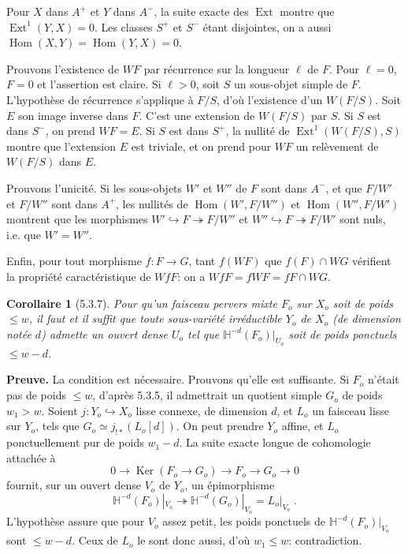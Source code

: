 \documentclass[12pt,a4paper]{article}
\theoremstyle{plain}
\newtheorem{corollary}[theorem]{Corollaire}
\theoremstyle{definition}
\theoremstyle{remark}
\DeclareMathOperator{\Hom}{Hom}
\DeclareMathOperator{\Ext}{Ext}
\DeclareMathOperator{\Ker}{Ker}
\newcommand{\HH}{\mathbb{H}}
\begin{document}
Pour $X$ dans $A^+$ et $Y$ dans $A^-$, la suite exacte des $\Ext$ montre que $\Ext^1(Y,X) = 0$. Les classes $S^+$ et $S^-$ \'etant disjointes, on a aussi $\Hom(X,Y) = \Hom(Y,X) = 0$.

Prouvons l'existence de $WF$ par r\'ecurrence sur la longueur $\ell$ de $F$. Pour $\ell = 0$, $F = 0$ et l'assertion est claire. Si $\ell > 0$, soit $S$ un sous-objet simple de $F$. L'hypoth\`ese de r\'ecurrence s'applique \`a $F/S$, d'o\`u l'existence d'un $W(F/S)$. Soit $E$ son image inverse dans $F$. C'est une extension de $W(F/S)$ par $S$. Si $S$ est dans $S^-$, on prend $WF = E$. Si $S$ est dans $S^+$, la nullit\'e de $\Ext^1(W(F/S), S)$ montre que l'extension $E$ est triviale, et on prend pour $WF$ un rel\`evement de $W(F/S)$ dans $E$.

Prouvons l'unicit\'e. Si les sous-objets $W'$ et $W''$ de $F$ sont dans $A^-$, et que $F/W'$ et $F/W''$ sont dans $A^+$, les nullit\'es de $\Hom(W', F/W'')$ et $\Hom(W'', F/W')$ montrent que les morphismes $W' \hookrightarrow F \twoheadrightarrow F/W''$ et $W'' \hookrightarrow F \twoheadrightarrow F/W'$ sont nuls, i.e. que $W' = W''$.

Enfin, pour tout morphisme $f: F \to G$, tant $f(WF)$ que $f(F) \cap WG$ v\'erifient la propri\'et\'e caract\'eristique de $WfF$: on a $WfF = fWF = fF \cap WG$.

\begin{corollary}[5.3.7]
Pour qu'un faisceau pervers mixte $F_o$ sur $X_o$ soit de poids $\leq w$, il faut et il suffit que toute sous-vari\'et\'e irr\'eductible $Y_o$ de $X_o$ (de dimension not\'ee $d$) admette un ouvert dense $U_o$ tel que $\HH^{-d}(F_o)|_{U_o}$ soit de poids ponctuels $\leq w-d$.
\end{corollary}

\noindent\textbf{Preuve.} La condition est n\'ecessaire. Prouvons qu'elle est suffisante. Si $F_o$ n'\'etait pas de poids $\leq w$, d'apr\`es 5.3.5, il admettrait un quotient simple $G_o$ de poids $w_1 > w$. Soient $j: Y_o \hookrightarrow X_o$ lisse connexe, de dimension $d$, et $L_o$ un faisceau lisse sur $Y_o$, tels que $G_o \simeq j_{!*}(L_o[d])$. On peut prendre $Y_o$ affine, et $L_o$ ponctuellement pur de poids $w_1-d$. La suite exacte longue de cohomologie attach\'ee \`a
\[
0 \to \Ker(F_o \to G_o) \to F_o \to G_o \to 0
\]
fournit, sur un ouvert dense $V_o$ de $Y_o$, un \'epimorphisme
\[
\HH^{-d}(F_o)|_{V_o} \twoheadrightarrow \HH^{-d}(G_o)|_{V_o} = L_o|_{V_o}\;.
\]
L'hypoth\`ese assure que pour $V_o$ assez petit, les poids ponctuels de $\HH^{-d}(F_o)|_{V_o}$ sont $\leq w-d$. Ceux de $L_o$ le sont donc aussi, d'o\`u $w_1 \leq w$: contradiction.
\end{document}
